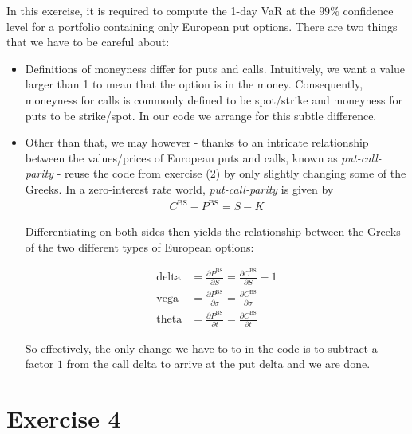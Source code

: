 \documentclass[10pt,a4paper]{article}
\theoremstyle{definition}
\begin{document}
	In this exercise, it is required to compute the 1-day VaR at the $99\%$ confidence level for a portfolio containing only European put options. There are two things that we have to be careful about:
	
	\begin{itemize}
	
	\item Definitions of moneyness differ for puts and calls. Intuitively, we want a value larger than 1 to mean that the option is in the money. Consequently, moneyness for calls is commonly defined to be spot/strike and moneyness for puts to be strike/spot. In our code we arrange for this subtle difference.
	
	\item  Other than that, we may however - thanks to an intricate relationship between the values/prices of European puts and calls, known as \emph{put-call-parity} \cite{G03} - reuse the code from exercise (2) by only slightly changing some of the Greeks. In a zero-interest rate world, \emph{put-call-parity} is given by	
	\begin{align*}
	C^{\text{BS}}- P^{\text{BS}} = S - K
	\end{align*}
	
	Differentiating on both sides then yields the relationship between the Greeks of the two different types of European options:
	
	\begin{align}
	\text{delta} &= \frac{\partial P^{\text{BS}}}{\partial S} = \frac{\partial C^{\text{BS}}}{\partial S} -1  \\
	\text{vega} &= \frac{\partial P^{\text{BS}}}{\partial \sigma} = \frac{\partial C^{\text{BS}}}{\partial \sigma} \\
	\text{theta} &= \frac{\partial P^{\text{BS}}}{\partial t} = \frac{\partial C^{\text{BS}}}{\partial t}
	\end{align}
	
	So effectively, the only change we have to to in the code is to subtract a factor $1$ from the call delta to arrive at the put delta and we are done.
	
	\end{itemize}
	
	
	\section*{Exercise 4}
	
	



\end{document}
